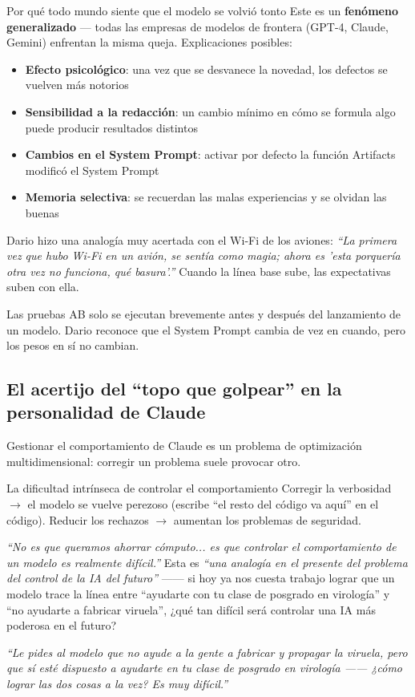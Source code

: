 \documentclass[a4paper]{article}
\begin{document}
\begin{warningbox}{Por qué todo mundo siente que el modelo se volvió tonto}
Este es un \textbf{fenómeno generalizado} — todas las empresas de modelos de frontera (GPT-4, Claude, Gemini) enfrentan la misma queja. Explicaciones posibles:

\begin{itemize}
    \item \textbf{Efecto psicológico}: una vez que se desvanece la novedad, los defectos se vuelven más notorios
    \item \textbf{Sensibilidad a la redacción}: un cambio mínimo en cómo se formula algo puede producir resultados distintos
    \item \textbf{Cambios en el System Prompt}: activar por defecto la función Artifacts modificó el System Prompt
    \item \textbf{Memoria selectiva}: se recuerdan las malas experiencias y se olvidan las buenas
\end{itemize}

Dario hizo una analogía muy acertada con el Wi-Fi de los aviones: \textit{``La primera vez que hubo Wi-Fi en un avión, se sentía como magia; ahora es 'esta porquería otra vez no funciona, qué basura'.''} Cuando la línea base sube, las expectativas suben con ella.

Las pruebas AB solo se ejecutan brevemente antes y después del lanzamiento de un modelo. Dario reconoce que el System Prompt cambia de vez en cuando, pero los pesos en sí no cambian.
\end{warningbox}

\subsection{El acertijo del ``topo que golpear'' en la personalidad de Claude}

Gestionar el comportamiento de Claude es un problema de optimización multidimensional: corregir un problema suele provocar otro.

\begin{knowledgebox}{La dificultad intrínseca de controlar el comportamiento}
Corregir la verbosidad $\to$ el modelo se vuelve perezoso (escribe ``el resto del código va aquí'' en el código). Reducir los rechazos $\to$ aumentan los problemas de seguridad.

\textit{``No es que queramos ahorrar cómputo... es que controlar el comportamiento de un modelo es realmente difícil.''} Esta es \textit{``una analogía en el presente del problema del control de la IA del futuro''} —— si hoy ya nos cuesta trabajo lograr que un modelo trace la línea entre ``ayudarte con tu clase de posgrado en virología'' y ``no ayudarte a fabricar viruela'', ¿qué tan difícil será controlar una IA más poderosa en el futuro?

\textit{``Le pides al modelo que no ayude a la gente a fabricar y propagar la viruela, pero que sí esté dispuesto a ayudarte en tu clase de posgrado en virología —— ¿cómo lograr las dos cosas a la vez? Es muy difícil.''}
\end{knowledgebox}
\end{document}
